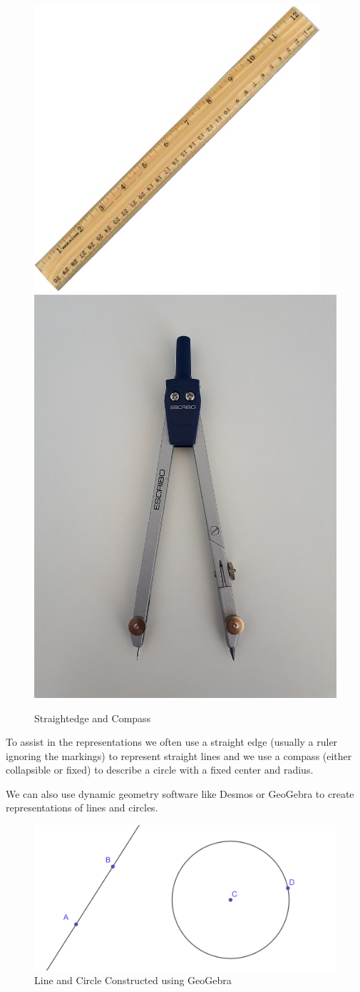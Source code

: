 \documentclass[
]{book}
\theoremstyle{definition}
\theoremstyle{definition}
\theoremstyle{definition}
\theoremstyle{definition}
\theoremstyle{remark}
\begin{document}
\begin{figure}

{\centering \includegraphics[width=0.48\linewidth]{images/Ruler} \includegraphics[width=0.48\linewidth]{images/Compass} 

}

\caption{Straightedge and Compass}\label{fig:Straightedge-Compass}
\end{figure}

To assist in the representations we often use a straight edge (usually a ruler ignoring the markings) to represent straight lines and we use a compass (either collapsible or fixed) to describe a circle with a fixed center and radius.

We can also use dynamic geometry software like Desmos or GeoGebra to create representations of lines and circles.

\begin{figure}

{\centering \includegraphics[width=0.6\linewidth]{images/circle-line} 

}

\caption{Line and Circle Constructed using GeoGebra}\label{fig:Straightedge-Compass2}
\end{figure}
\end{document}
